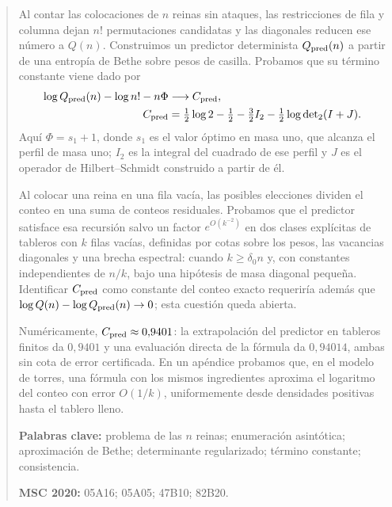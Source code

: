 \begin{abstract}
\noindent Al contar las colocaciones de $n$ reinas sin ataques, las restricciones de fila y
columna dejan $n!$ permutaciones candidatas y las diagonales reducen ese número a $Q(n)$.
Construimos un predictor determinista $Q_{\rm pred}(n)$ a partir de una entropía de Bethe sobre
pesos de casilla. Probamos que su término constante viene dado por
\[
\begin{aligned}
 \log Q_{\rm pred}(n)-\log n!-n\Phi &\longrightarrow C_{\rm pred},\\
 C_{\rm pred} &=\tfrac12\log2-\tfrac12-\tfrac32I_2-\tfrac12\log{\det}_2(I+J).
\end{aligned}
\]
Aquí $\Phi=s_1+1$, donde $s_1$ es el valor óptimo en masa uno, que alcanza el perfil de masa uno;
$I_2$ es la integral del cuadrado de ese perfil y $J$ es el operador de Hilbert--Schmidt
construido a partir de él.

\smallskip\noindent Al colocar una reina en una fila vacía, las posibles elecciones dividen el conteo
en una suma de conteos residuales. Probamos que el predictor satisface esa recursión salvo un factor
$e^{O(k^{-2})}$ en dos clases explícitas de tableros con $k$ filas vacías, definidas por cotas sobre los
pesos, las vacancias diagonales y una brecha espectral: cuando $k\ge\delta_0 n$ y, con constantes
independientes de $n/k$, bajo una hipótesis de masa diagonal pequeña.
Identificar $C_{\rm pred}$ como constante del conteo exacto requeriría además que
$\log Q(n)-\log Q_{\rm pred}(n)\to0$; esta cuestión queda abierta.

\smallskip\noindent Numéricamente, $C_{\rm pred}\approx0{,}9401$: la extrapolación del predictor en tableros
finitos da $0{,}9401$ y una evaluación directa de la fórmula da $0{,}94014$, ambas sin cota de error
certificada. En un apéndice probamos que, en el modelo de torres, una fórmula con los mismos ingredientes
aproxima el logaritmo del conteo con error $O(1/k)$, uniformemente desde densidades positivas hasta el
tablero lleno.

\medskip\noindent
\textbf{Palabras clave:} problema de las $n$ reinas; enumeración asintótica; aproximación de Bethe;
determinante regularizado; término constante; consistencia.

\noindent
\textbf{MSC 2020:} 05A16; 05A05; 47B10; 82B20.
\end{abstract}
